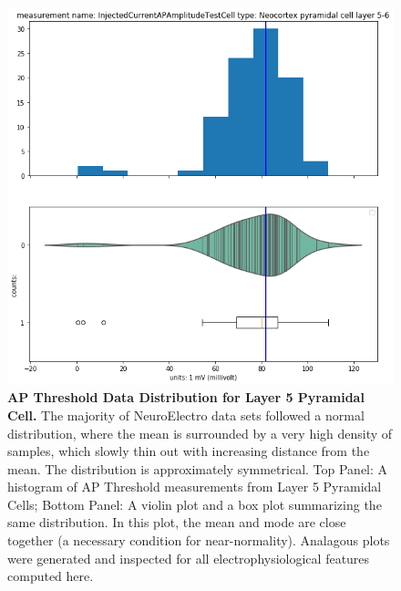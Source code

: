 \begin{figure} 
    \begin{center}
   \includegraphics[scale=0.8]{figures/mean_well_served.png}
   \caption[AP Threshold Data Distribution for Layer 5 Pyramidal Cell]{\textbf{AP Threshold Data Distribution for Layer 5 Pyramidal Cell.} The majority of NeuroElectro data sets followed a normal distribution, where the mean is surrounded by a very high density of samples, which slowly thin out with increasing distance from the mean. The distribution is approximately symmetrical. Top Panel: A histogram of AP Threshold measurements from Layer 5 Pyramidal Cells; Bottom Panel: A violin plot and a box plot summarizing the same distribution. In this plot, the mean and mode are close together (a necessary condition for near-normality).
   Analagous plots were generated and inspected for all electrophysiological features computed here.}
   \label{fig:normal-feature}
    \end{center}
\end{figure}   

 
